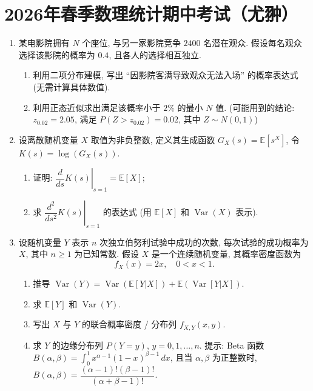 \section{2026年春季数理统计期中考试（尤翀）}
\begin{enumerate}
\item 某电影院拥有 $N$ 个座位, 与另一家影院竞争 $2400$ 名潜在观众. 假设每名观众选择该影院的概率为 $0.4$, 且各人的选择相互独立.

\begin{enumerate}[label=(\arabic*)]
    \item 利用二项分布建模, 写出 ``因影院客满导致观众无法入场'' 的概率表达式 (无需计算具体数值).

    \item 利用正态近似求出满足该概率小于 $2\%$ 的最小 $N$ 值. (可能用到的结论: $z_{0.02}=2.05$, 满足 $P(Z>z_{0.02})=0.02$, 其中 $Z\sim N(0,1)$)
\end{enumerate}

\item  设离散随机变量 $X$ 取值为非负整数, 定义其生成函数 $G_X(s)=\mathbb{E}[s^X]$, 令 $K(s)=\log(G_X(s))$.

\begin{enumerate}[label=(\arabic*)]
    \item 证明: $\left.\dfrac{d}{ds}K(s)\right|_{s=1}=\mathbb{E}[X]$;

    \item 求 $\left.\dfrac{d^2}{ds^2}K(s)\right|_{s=1}$ 的表达式 (用 $\mathbb{E}[X]$ 和 $\operatorname{Var}(X)$ 表示).
\end{enumerate}

\item 设随机变量 $Y$ 表示 $n$ 次独立伯努利试验中成功的次数, 每次试验的成功概率为 $X$, 其中 $n\geq 1$ 为已知常数. 假设 $X$ 是一个连续随机变量, 其概率密度函数为
\[
f_X(x)=2x,\quad 0<x<1.
\]

\begin{enumerate}[label=(\arabic*)]
    \item 推导 $\operatorname{Var}(Y)=\operatorname{Var}(\mathbb{E}[Y|X])+\mathbb{E}(\operatorname{Var}[Y|X])$.

    \item 求 $\mathbb{E}[Y]$ 和 $\operatorname{Var}(Y)$.

    \item 写出 $X$ 与 $Y$ 的联合概率密度 / 分布列 $f_{X,Y}(x,y)$.

    \item 求 $Y$ 的边缘分布列 $P(Y=y)$, $y=0,1,\ldots,n$. 提示: Beta 函数 $B(\alpha,\beta)=\int_0^1 x^{\alpha-1}(1-x)^{\beta-1}\,dx$, 且当 $\alpha,\beta$ 为正整数时, $B(\alpha,\beta)=\dfrac{(\alpha-1)!(\beta-1)!}{(\alpha+\beta-1)!}$.
\end{enumerate}


\end{enumerate}
